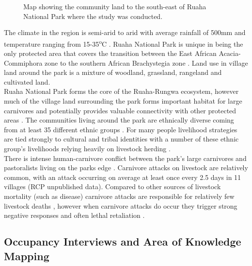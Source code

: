 \begin{figure}[htb]
\centering
\setlength\fboxsep{0pt}
\setlength\fboxrule{0.5pt}
\caption{Map showing the community land to the south-east of Ruaha National Park where the study was conducted.}
\label{fig:area_map}
\end{figure}

The climate in the region is semi-arid to arid with average rainfall of 500mm \cite{dickman2008} and temperature ranging from 15-35\textsuperscript{o}C \cite{Darch1999}. Ruaha National Park is unique in being the only protected area that covers the transition between the East African Acacia-Commiphora zone to the southern African Brachystegia zone  \cite{Douglas-Hamilton1982,Williams1999}. Land use in village land around the park is a mixture of woodland, grassland, rangeland and cultivated land.\\

Ruaha National Park forms the core of the Ruaha-Rungwa ecosystem, however much of the village land surrounding the park forms important habitat for large carnivores and potentially provides valuable connectivity with other protected areas \cite{Dickman2005,Abade2014h}. The communities living around the park are ethnically diverse coming from at least 35 different ethnic groups \cite{Williams2005}. For many people livelihood strategies are tied strongly to cultural and tribal identities \cite{Williams2005,Dickman2008} with a number of these ethnic group's livelihoods relying heavily on livestock herding \cite{Dickman2008}.\\

There is intense human-carnivore conflict between the park's large carnivores and pastoralists living on the parks edge \cite{Dickman2008}. Carnivore attacks on livestock are relatively common, with an attack occurring on average at least once every 2.5 days in 11 villages (RCP unpublished data). Compared to other sources of livestock mortality (such as disease) carnivore attacks are responsible for relatively few livestock deaths \cite{Dickman2014d}, however when carnivore attacks do occur they trigger strong negative responses and often lethal retaliation \cite{Abade2014g,Dickman2008}. 

\subsection{Occupancy Interviews and Area of Knowledge Mapping}


